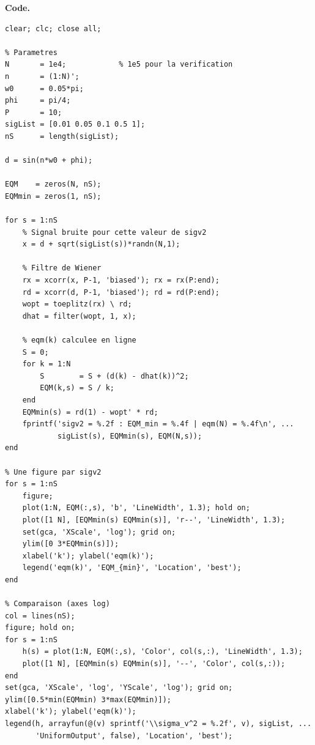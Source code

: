 \textbf{Code.}
\begin{lstlisting}
clear; clc; close all;

% Parametres
N       = 1e4;            % 1e5 pour la verification
n       = (1:N)';
w0      = 0.05*pi;
phi     = pi/4;
P       = 10;
sigList = [0.01 0.05 0.1 0.5 1];
nS      = length(sigList);

d = sin(n*w0 + phi);

EQM    = zeros(N, nS);
EQMmin = zeros(1, nS);

for s = 1:nS
    % Signal bruite pour cette valeur de sigv2
    x = d + sqrt(sigList(s))*randn(N,1);

    % Filtre de Wiener
    rx = xcorr(x, P-1, 'biased'); rx = rx(P:end);
    rd = xcorr(d, P-1, 'biased'); rd = rd(P:end);
    wopt = toeplitz(rx) \ rd;
    dhat = filter(wopt, 1, x);

    % eqm(k) calculee en ligne
    S = 0;
    for k = 1:N
        S        = S + (d(k) - dhat(k))^2;
        EQM(k,s) = S / k;
    end
    EQMmin(s) = rd(1) - wopt' * rd;
    fprintf('sigv2 = %.2f : EQM_min = %.4f | eqm(N) = %.4f\n', ...
            sigList(s), EQMmin(s), EQM(N,s));
end

% Une figure par sigv2
for s = 1:nS
    figure;
    plot(1:N, EQM(:,s), 'b', 'LineWidth', 1.3); hold on;
    plot([1 N], [EQMmin(s) EQMmin(s)], 'r--', 'LineWidth', 1.3);
    set(gca, 'XScale', 'log'); grid on;
    ylim([0 3*EQMmin(s)]);
    xlabel('k'); ylabel('eqm(k)');
    legend('eqm(k)', 'EQM_{min}', 'Location', 'best');
end

% Comparaison (axes log)
col = lines(nS);
figure; hold on;
for s = 1:nS
    h(s) = plot(1:N, EQM(:,s), 'Color', col(s,:), 'LineWidth', 1.3);
    plot([1 N], [EQMmin(s) EQMmin(s)], '--', 'Color', col(s,:));
end
set(gca, 'XScale', 'log', 'YScale', 'log'); grid on;
ylim([0.5*min(EQMmin) 3*max(EQMmin)]);
xlabel('k'); ylabel('eqm(k)');
legend(h, arrayfun(@(v) sprintf('\\sigma_v^2 = %.2f', v), sigList, ...
       'UniformOutput', false), 'Location', 'best');
\end{lstlisting}

